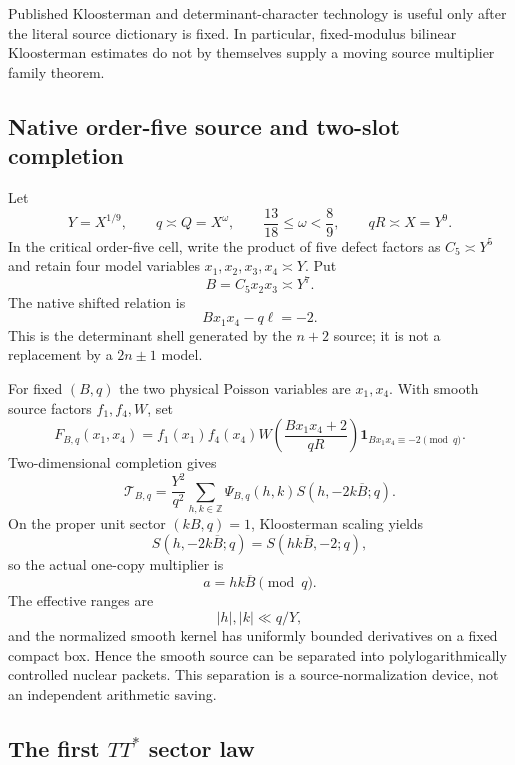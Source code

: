 \documentclass[11pt]{article}
\theoremstyle{definition}
\newcommand{\1}{\mathbf 1}
\newcommand{\Z}{\mathbb Z}
\begin{document}
Published Kloosterman and determinant-character technology is useful only
after the literal source dictionary is fixed.  In particular, fixed-modulus
bilinear Kloosterman estimates do not by themselves supply a moving source
multiplier family theorem.

\subsection{Native order-five source and two-slot completion}

Let
\[
 Y=X^{1/9},\qquad q\asymp Q=X^\omega,\qquad
 \frac{13}{18}\le \omega<\frac89,\qquad qR\asymp X=Y^9.
\]
In the critical order-five cell, write the product of five defect factors as
$C_5\asymp Y^5$ and retain four model variables
$x_1,x_2,x_3,x_4\asymp Y$.  Put
\[
   B=C_5x_2x_3\asymp Y^7.
\]
The native shifted relation is
\begin{equation}
   \boxed{Bx_1x_4-q\ell=-2.}
   \label{eq:native-shell}
\end{equation}
This is the determinant shell generated by the $n+2$ source; it is not a
replacement by a $2n\pm1$ model.

For fixed $(B,q)$ the two physical Poisson variables are $x_1,x_4$.  With
smooth source factors $f_1,f_4,W$, set
\[
 F_{B,q}(x_1,x_4)
 =
 f_1(x_1)f_4(x_4)
 W\!\left(\frac{Bx_1x_4+2}{qR}\right)
 \1_{Bx_1x_4\equiv-2\pmod q}.
\]
Two-dimensional completion gives
\begin{equation}
 \mathcal T_{B,q}
 =
 \frac{Y^2}{q^2}
 \sum_{h,k\in\Z}
   \Psi_{B,q}(h,k)
   S(h,-2k\overline B;q).
 \label{eq:two-poisson}
\end{equation}
On the proper unit sector $(kB,q)=1$, Kloosterman scaling yields
\[
  S(h,-2k\overline B;q)=S(hk\overline B,-2;q),
\]
so the actual one-copy multiplier is
\begin{equation}
   \boxed{a=hk\overline B\pmod q.}
   \label{eq:one-copy-multiplier}
\end{equation}
The effective ranges are
\[
   |h|,|k|\ll q/Y,
\]
and the normalized smooth kernel has uniformly bounded derivatives on a
fixed compact box.  Hence the smooth source can be separated into
polylogarithmically controlled nuclear packets.  This separation is a
source-normalization device, not an independent arithmetic saving.

\subsection{The first \texorpdfstring{$TT^\ast$}{TT*} sector law}
\end{document}
